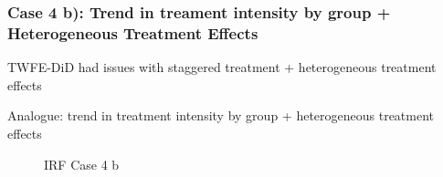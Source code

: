 \documentclass[notes,11pt, aspectratio = 169]{beamer}
\begin{document}
\begin{frame}\frametitle{Case 4 b): Trend in treament intensity by group + Heterogeneous Treatment Effects }
    \begin{wideitemize}
        \item TWFE-DiD had issues with staggered treatment + heterogeneous treatment effects
        \item Analogue: trend in treatment intensity by group  + heterogeneous treatment effects
    \end{wideitemize}

    \begin{figure}
        \centering
      \caption{IRF Case 4 b}
      \end{figure}
\end{frame}
\end{document}
